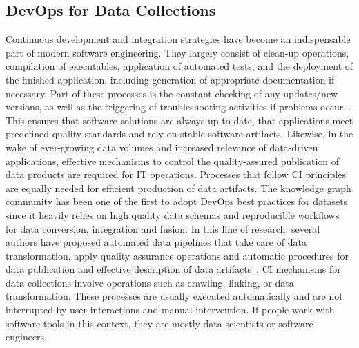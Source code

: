 \documentclass[runningheads]{llncs}
\begin{document}
\subsection{DevOps for Data Collections}
Continuous development and integration strategies have become an indispensable part of modern software engineering.
They largely consist of clean-up operations, compilation of executables, application of automated tests, and the deployment of the finished application, including generation of appropriate documentation if necessary. Part of these processes is the constant checking of any updates/new versions, as well as the triggering of troubleshooting activities if problems occur~\cite{fowler}.
This ensures that software solutions are always up-to-date, that applications meet predefined quality standards and rely on stable software artifacts. Likewise, in the wake of ever-growing data volumes and increased relevance of data-driven applications, effective mechanisms to control the quality-assured publication of data products are required for IT operations. Processes that follow CI principles are equally needed for efficient production of data artifacts. The knowledge graph community has been one of the first to adopt DevOps best practices for datasets since it heavily relies on high quality data schemas and reproducible workflows for data conversion, integration and fusion. In this line of research, several authors have proposed automated data pipelines that take care of data transformation, apply quality assurance operations and automatic procedures for data publication and effective description of data artifacts~\cite{cirulli,klimek,kucera,meissner,rojas,roman,stadler,dataid}. CI mechanisms for data collections involve operations such as crawling, linking, or data transformation. These processes are usually executed automatically and are not interrupted by user interactions and manual intervention. If people work with software tools in this context, they are mostly data scientists or software engineers.
\end{document}
